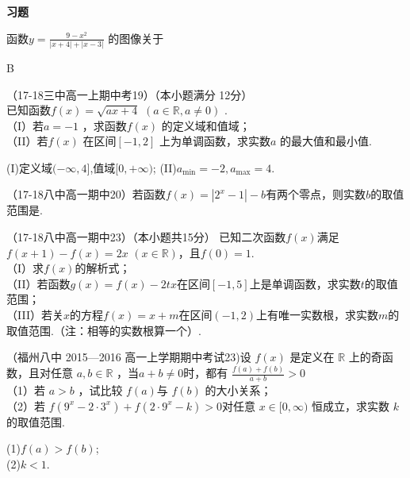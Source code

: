 \begin{exercise}{\large \bf 习\hspace{0.6em}题}

\item
函数$y=\frac{9-x^2}{|x+4|+|x-3|}$ 的图像关于\xz
{}
\begin{answer}
B
\end{answer}


\item
（17-18三中高一上期中考19）（本小题满分 12分）\\
已知函数$f(x)=\sqrt{ax+4}$ $(a\in\mathbb{R},a\neq0)$  .\\
（I）若$a=-1$ ，求函数$f(x)$ 的定义域和值域；\\
（II）若$f(x)$ 在区间$[-1,2] $ 上为单调函数，求实数$a$ 的最大值和最小值.\\
\begin{answer}
(I)定义域$(-\infty,4]$,值域$[0,+\infty)$;
(II)$a_{\min}=-2,a_{\max}=4 $.
\end{answer}
\vspace{12em}



\item
（17-18八中高一期中20）若函数$f(x)=|2^x-1|-b $有两个零点，则实数$b$的取值范围是\tk.\\
\item
（17-18八中高一期中23）（本小题共15分）
已知二次函数$f(x)$满足$f(x+1)-f(x)=2x $ $(x\in\mathbb{R})$，且$f(0)=1$.\\
（I）求$f(x)$的解析式；\\
（II）若函数$g(x)=f(x)-2tx$在区间$[-1,5]$上是单调函数，求实数$t$的取值范围；\\
（III）若关$x$的方程$f(x)=x+m $在区间$(-1,2)$上有唯一实数根，求实数$m$的取值范围.（注：相等的实数根算一个）.\\
\vspace{16em}



\item
（福州八中 2015—2016 高一上学期期中考试23)设 $f (x )$ 是定义在 $\mathbb{R}$ 上的奇函数，且对任意 $a,b\in \mathbb{R}$ ，当$a+b\neq0$时，都有 $\frac{f(a)+f(b)}{a+b}>0$\\
（1）若 $a> b$ ，试比较 $f (a ) $与 $f (b)$ 的大小关系；\\
（2）若 $f (9^x- 2\cdot 3^x )+ f ( 2\cdot 9^x-k )> 0 $对任意 $x\in[0,\infty )$ 恒成立，求实数 $k$ 的取值范围.
\begin{answer}
(1)$f(a)>f(b)$;\\
(2)$k<1$.\\
\end{answer}
\vspace{12em}

\end{exercise}
{\hspace{2em}}
{\hspace{2em}}
{\hspace{2em}}
{\hspace{2em}}


\stopexercise
